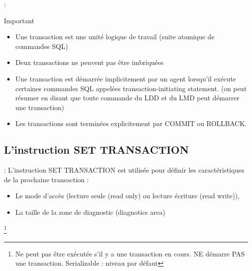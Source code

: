 \documentclass[10pt]{beamer}
\begin{document}
\begin{frame}{\secname : \subsecname}
    \begin{alertblock}{Important}
        \begin{itemize}
            \item Une transaction est une unité logique de travail (suite atomique de commandes SQL)
            \item Deux transactions ne peuvent pas être imbriquées
            \item Une transaction est démarrée implicitement par un agent lorsqu'il exécute certaines commandes SQL appelées transaction-initiating statement.  (on peut résumer en disant que toute commande du LDD et du LMD peut démarrer une transaction)
            \item Les transactions sont terminées explicitement par COMMIT ou ROLLBACK.
        \end{itemize}
    \end{alertblock}
\end{frame}
\subsection{L'instruction SET TRANSACTION}
\begin{frame}{\secname : \subsecname}
    L'instruction SET TRANSACTION est utilisée pour définir les caractéristiques de la prochaine transaction :
    \begin{itemize}
        \item Le mode d'accès (lecture seule (read only) ou lecture écriture (read write)),
        \item La taille de la zone de diagnostic (diagnotics area)
    \end{itemize}
    \footnote{Ne peut pas être exécutée s'il y a une transaction en cours. NE démarre PAS une transaction. Serializable : niveau par défaut}
\end{frame}
\end{document}
